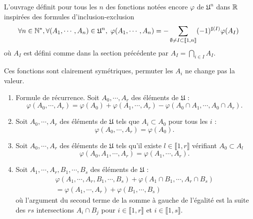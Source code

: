 L'ouvrage définit pour tous les $n$ des fonctions notées encore $\varphi$ de $\mathfrak{U}^n$ dans $\mathbb{R}$ inspirées des formules d'inclusion-exclusion
\begin{displaymath}
  \forall n \in \mathbb{N}^*, \forall (A_1,\cdots, A_n) \in \mathfrak{U}^n, \;
  \varphi(A_1, \cdots, A_n) = - \sum_{\emptyset \neq I \subset \llbracket 1 , n\rrbracket}(-1)^{\sharp(I)}\varphi(A_I)
\end{displaymath}
où $A_I$ est défini comme dans la section précédente par $A_I = \bigcap_{i\in I} A_I$.
\begin{rem}
  Ces fonctions sont clairement symétriques, permuter les $A_i$ ne change pas la valeur.
\end{rem}

\begin{prop}
  \begin{enumerate}
    \item Formule de récurrence. Soit $A_0, \cdots, A_r$ des éléments de $\mathfrak{U}$ :
    \begin{displaymath}
      \varphi(A_0,\cdots, A_r) = \varphi(A_0) + \varphi(A_1,\cdots, A_r) - \varphi(A_0\cap A_1, \cdots, A_0\cap A_r).
    \end{displaymath}
    \item Soit $A_0, \cdots, A_r$ des éléments de $\mathfrak{U}$ tels que $A_i \subset A_0$ pour tous les $i$ :
    \begin{displaymath}
      \varphi(A_0,\cdots, A_r) = \varphi(A_0).
    \end{displaymath}
    \item Soit $A_0, \cdots, A_r$ des éléments de $\mathfrak{U}$ tels qu'il existe $l \in \llbracket 1, r \rrbracket$ vérifiant $A_0 \subset A_l$
    \begin{displaymath}
      \varphi(A_0,A_1, \cdots,A_r) = \varphi(A_1, \cdots,A_r).
    \end{displaymath}
    \item Soit $A_1, \cdots, A_r, B_1, \cdots, B_s$ des éléments de $\mathfrak{U}$ :
    \begin{align*}
      \varphi(A_1, \cdots, A_r, B_1, \cdots, B_s) + \varphi(A_1\cap B_1, \cdots, A_r\cap B_s) \\
      = \varphi(A_1,\cdots,A_r) + \varphi(B_1, \cdots, B_s)
    \end{align*}
où l'argument du second terme de la somme à gauche de l'égalité est la suite des $rs$ intersections $A_i \cap B_j$ pour $i \in \llbracket 1,r \rrbracket$ et $i \in \llbracket 1,s \rrbracket$.
  \end{enumerate}
\end{prop}

